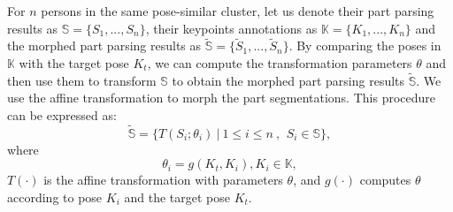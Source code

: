 \documentclass[10pt,twocolumn,letterpaper]{article}
\begin{document}
For $n$ persons in the same pose-similar cluster, let us denote their part parsing results as $\mathbb{S} = \{S_{1},...,S_{n}\}$, their keypoints annotations as $\mathbb{K} = \{K_{1},...,K_{n}\}$ and the morphed part parsing results as $\mathbb{\widetilde{S}} = \{\widetilde{S}_{1},...,\widetilde{S}_{n}\}$. By comparing the poses in $\mathbb{K}$ with the target pose $K_{t}$, we can compute the transformation parameters $\theta$ and then use them to transform $\mathbb{S}$ to obtain the morphed part parsing results $\mathbb{\widetilde{S}}$. We use the affine transformation to morph the part segmentations. This procedure can be expressed as:
\begin{equation}
\mathbb{\widetilde{S}} = \{T(S_{i};\theta_{i})~|~1\leq i\leq n~,\,~S_{i}\in \mathbb{S}\},
\end{equation}
where
\begin{equation}
    \theta_{i} = g(K_{t},K_{i}), K_{i}\in \mathbb{K},\nonumber
\end{equation}
$T(\cdot)$ is the affine transformation with parameters $\theta$, and $g(\cdot)$ computes $\theta$ according to pose $K_{i}$ and the target pose $K_{t}$.
\end{document}
